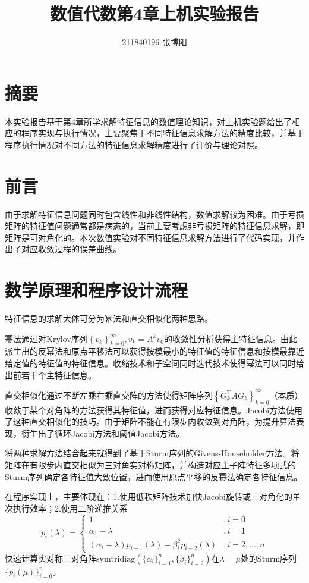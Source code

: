 \documentclass[UTF8,a4paper,10pt]{ctexart}
\title{\textbf{数值代数第4章上机实验报告}}
\author{ 211840196 张博阳 }
\date{}
\begin{document}
    \maketitle
 
    \section*{摘要}
        \par
        本实验报告基于第4章所学求解特征信息的数值理论知识，对上机实验题给出了相应的程序实现与执行情况，主要聚焦于不同特征信息求解方法的精度比较，并基于程序执行情况对不同方法的特征信息求解精度进行了评价与理论对照。

    \section{前言}
        \par
        由于求解特征信息问题同时包含线性和非线性结构，数值求解较为困难。由于亏损矩阵的特征值问题通常都是病态的，当前主要考虑非亏损矩阵的特征信息求解，即矩阵是可对角化的。本次数值实验对不同特征信息求解方法进行了代码实现，并作出了对应收敛过程的误差曲线。
        
    \section{数学原理和程序设计流程}
        \par
        特征信息的求解大体可分为幂法和直交相似化两种思路。
        \par
        幂法通过对Krylov序列$\left\{v_k\right\}_{k=0}^{\infty},v_k=A^kv_0$的收敛性分析获得主特征信息。由此派生出的反幂法和原点平移法可以获得按模最小的特征值的特征信息和按模最靠近给定值的特征值的特征信息。收缩技术和子空间同时迭代技术使得幂法可以同时给出前若干个主特征信息。
        \par
        直交相似化通过不断左乘右乘直交阵的方法使得矩阵序列$\left\{G_k^{\mathrm{T}}AG_k\right\}_{k=0}^{\infty}$（本质）收敛于某个对角阵的方法获得其特征值，进而获得对应特征信息。Jacobi方法使用了这种直交相似化的技巧。由于矩阵不能在有限步内收敛到对角阵，为提升算法表现，衍生出了循环Jacobi方法和阈值Jacobi方法。
        \par
        将两种求解方法结合起来就得到了基于Sturm序列的Givens-Householder方法。将矩阵在有限步内直交相似为三对角实对称矩阵，并构造对应主子阵特征多项式的Sturm序列确定各特征值大致位置，进而使用原点平移的反幂法确定各特征信息。
        \par
        在程序实现上，主要体现在：1.使用低秩矩阵技术加快Jacobi旋转或三对角化的单次执行效率；2.使用二阶递推关系
        $$
        p_i(\lambda)=
        \begin{cases}
            1&,i=0 \\
            \alpha_1-\lambda&,i=1\\
            (\alpha_i-\lambda)p_{i-1}(\lambda)-\beta_i^2p_{i-2}(\lambda)&,i=2,\dots,n
        \end{cases}
        $$
        快速计算实对称三对角阵$\mathrm{symtridiag}(\{\alpha_i\}_{i=1}^n,\{\beta_i\}_{i=2}^n)$在$\lambda=\mu$处的Sturm序列$\{p_i(\mu)\}_{i=0}^n$。
        
\end{document}
